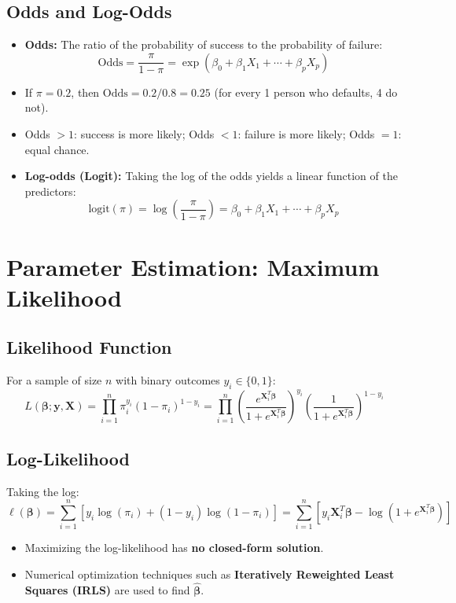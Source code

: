 \documentclass{article}
\begin{document}
\subsection{Odds and Log-Odds}
\begin{itemize}
    \item \textbf{Odds:} The ratio of the probability of success to the probability of failure:
    $$\text{Odds} = \frac{\pi}{1 - \pi} = \exp(\beta_0 + \beta_1 X_1 + \cdots + \beta_p X_p)$$
    \item If $\pi = 0.2$, then $\text{Odds} = 0.2/0.8 = 0.25$ (for every 1 person who defaults, 4 do not).
    \item Odds $> 1$: success is more likely; Odds $< 1$: failure is more likely; Odds $= 1$: equal chance.
    \item \textbf{Log-odds (Logit):} Taking the log of the odds yields a linear function of the predictors:
    $$\text{logit}(\pi) = \log\left(\frac{\pi}{1 - \pi}\right) = \beta_0 + \beta_1 X_1 + \cdots + \beta_p X_p$$
\end{itemize}

\newpage
\section{Parameter Estimation: Maximum Likelihood}

\subsection{Likelihood Function}
For a sample of size $n$ with binary outcomes $y_i \in \{0, 1\}$:
$$L(\boldsymbol{\beta}; \mathbf{y}, \mathbf{X}) = \prod_{i=1}^{n} \pi_i^{y_i} (1 - \pi_i)^{1 - y_i} = \prod_{i=1}^{n} \left(\frac{e^{\mathbf{X}_i^T\boldsymbol{\beta}}}{1 + e^{\mathbf{X}_i^T\boldsymbol{\beta}}}\right)^{y_i} \left(\frac{1}{1 + e^{\mathbf{X}_i^T\boldsymbol{\beta}}}\right)^{1 - y_i}$$

\subsection{Log-Likelihood}
Taking the log:
$$\ell(\boldsymbol{\beta}) = \sum_{i=1}^{n} \left[ y_i \log(\pi_i) + (1 - y_i)\log(1 - \pi_i) \right] = \sum_{i=1}^{n} \left[ y_i \mathbf{X}_i^T\boldsymbol{\beta} - \log(1 + e^{\mathbf{X}_i^T\boldsymbol{\beta}}) \right]$$

\begin{itemize}
    \item Maximizing the log-likelihood has \textbf{no closed-form solution}.
    \item Numerical optimization techniques such as \textbf{Iteratively Reweighted Least Squares (IRLS)} are used to find $\hat{\boldsymbol{\beta}}$.
\end{itemize}
\end{document}
